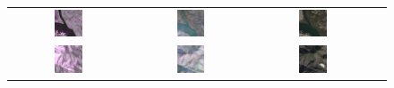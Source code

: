 \begin{figure}[h!]
    \centering
    \setlength{\tabcolsep}{2pt}
    \renewcommand{\arraystretch}{1.0}
    \begin{tabular}{c *{3}{c}}
        
        \includegraphics[width=0.25\textwidth]{img/seasons/fall/sample_000031_sar_pseudo.png} &
        \includegraphics[width=0.25\textwidth]{img/seasons/fall/sample_000031_pred_rgb.png} &
        \includegraphics[width=0.25\textwidth]{img/seasons/fall/sample_000031_true_rgb.png} \\
        
        \includegraphics[width=0.25\textwidth]{img/seasons/fall/sample_000019_sar_pseudo.png} &
        \includegraphics[width=0.25\textwidth]{img/seasons/fall/sample_000019_pred_rgb.png} &
        \includegraphics[width=0.25\textwidth]{img/seasons/fall/sample_000019_true_rgb.png} \\
        

\end{tabular}
\end{figure}
